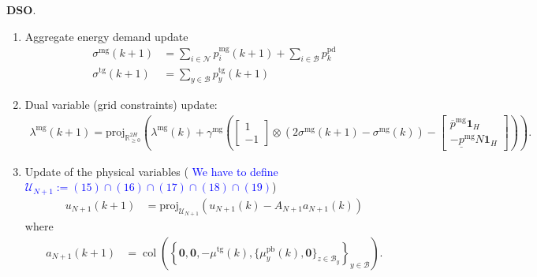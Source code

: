 \documentclass[10pt]{article}
\newcommand{\mc}{\mathcal}
\newcommand{\bb}{\mathbb}
\newcommand{\R}{\bb R}
\newcommand{\blue}{\textcolor{blue}}
\newcommand{\proj}{\mathrm{proj}}
\newcommand{\col}{\operatorname{col}}
\newcommand{\0}{\mathbf{0}}
\newcommand{\1}{\mathbf{1}}
\begin{document}
\begin{algorithm}[H]
\begin{algorithmic}[1]
\bigskip
\textbf{DSO}.	
	\begin{enumerate}[(1)]
	\item Aggregate energy demand update
	 \begin{align*}
	 \sigma^{\text{mg}}(k+1) &= \sum_{i \in \mc N} p_i^{\text{mg}}(k+1) + \sum_{i \in \mc B} p^{\text{pd}}_{k}\\
	 \sigma^{\text{tg}}(k+1) &= \sum_{y \in \mc B} p_y^{\text{tg}}(k+1)
	 \end{align*}	

	\smallskip	
	\item Dual variable (grid constraints) update:
	\vspace*{-.5em}
	\begin{align*}
	\lambda^{\text{mg}}(k+1) = \textstyle
	\proj_{\R^{2 H}_{\geq 0}}\left( 
	\lambda^{\text{mg}}(k) + \gamma^{\text{mg}} \left( 
	\left[
	\begin{smallmatrix}
	1\\
	- 1 
	\end{smallmatrix}
	\right] \otimes (2 \sigma^{\text{mg}}(k+1)- \sigma^{\text{mg}}(k)) 
	-
	\left[
	\begin{smallmatrix}
	\overline{p}^{\mathrm{mg}}\1_{H} \\
	-     \underline{p}^{\mathrm{mg}}N \1_{H}
	\end{smallmatrix} 
	\right]  
	\right)
	\right).
	\end{align*}


	 \smallskip
	 \item Update of the physical variables (\blue{ We have to define $\mc U_{N+1}:= (15) \cap (16) \cap (17) \cap (18) \cap (19)$})
	\begin{align*}
	u_{N+1}(k+1) &= \proj_{\mc U_{N+1}}  \left( u_{N+1}(k) - A_{N+1} a_{N+1}(k) \right)
	\end{align*}
where
\begin{align*}
a_{N+1}(k+1) &= \col \left( 
	\left\{
	\0,\0,-\mu^{\text{tg}}(k), 
	\{ \mu_y^{\text{pb}}(k), \0 \}_{z \in \mc B_y}
	\right\}_{y \in \mc B}
	\right).
\end{align*} 
	 

\end{enumerate}
\end{algorithmic}
\end{algorithm}
\end{document}
